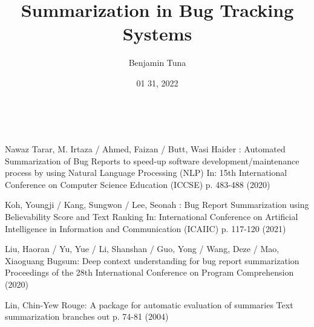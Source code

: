 \documentclass[a4paper,10pt, bibliography=totocnumbered]{scrreprt}
\author{Benjamin Tuna}
\title{Summarization in Bug Tracking Systems }
\subtitle{ }
\date{01 31, 2022}
\makeatletter
\renewcommand{\maketitle}{\begin{titlepage}
    \vskip 10\p@
    \hbox{
      \vrule depth 0.99\textheight
        \mbox{\hspace{2em}}
      \vtop{
        \vskip 10\p@
        \hspace{4pt}
        \vskip 50\p@
        \begin{flushleft}
          \Large \@author \par
        \end{flushleft}
        \vskip 50\p@
        \begin{flushleft}
          \huge \bfseries \@title \par
        \end{flushleft}
        \begin{flushleft}
          \Large \bfseries \@subtitle \par
        \end{flushleft}
        \vskip 70\p@
        \begin{flushleft}
          \Large \@publishers \par
        \end{flushleft}
        \vskip 50\p@
        \begin{flushleft}
          \Large \@date \par
        \end{flushleft}
        }}
  \end{titlepage}
}
\makeatother
\begin{document}
\maketitle



\tableofcontents










\begin{thebibliography}{9}

 Nawaz Tarar, M. Irtaza / Ahmed, Faizan / Butt, Wasi Haider : Automated Summarization of Bug Reports to speed-up software development/maintenance process by using Natural Language Processing (NLP) In: 15th International Conference on Computer Science Education (ICCSE) p. 483-488 (2020)

Koh, Youngji / Kang, Sungwon / Lee, Seonah : 
Bug Report Summarization using Believability Score and Text Ranking
In: International Conference on Artificial Intelligence in Information and Communication (ICAIIC) p. 117-120 (2021)

 Liu, Haoran / Yu, Yue / Li, Shanshan / Guo, Yong / Wang, Deze / Mao, Xiaoguang 
Bugsum: Deep context understanding for bug report summarization  
Proceedings of the 28th International Conference on Program Comprehension (2020)

Lin, Chin-Yew 
Rouge: A package for automatic evaluation of summaries  
Text summarization branches out p. 74-81 (2004)


\end{thebibliography}

\listoffigures

\listoftables
\end{document}
